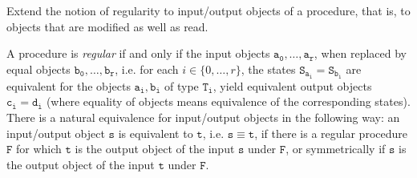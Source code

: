 \begin{Exercise}
    Extend the notion of regularity to input/output objects of a procedure, 
    that is, to objects that are modified as well as read.
\end{Exercise}

\begin{solution}
    A procedure is \textit{regular} if and only if the input objects 
    $\mathtt{a_{0}}, \dots ,\mathtt{a_{r}}$, when replaced by equal objects 
    $\mathtt{b_{0}}, \dots, \mathtt{b_{r}}$, i.e. for each $i \in 
    \{0, \dots, r \}$, the states $\mathtt{S_{a_{i}}} = \mathtt{S_{b_{i}}}$ are 
    equivalent for the objects $\mathtt{a_{i}}, \mathtt{b_{i}}$ of type 
    $\mathtt{T_i}$, yield equivalent output objects $\mathtt{c_{i}} = \mathtt{d_{i}}$ 
    (where equality of objects means equivalence of the corresponding 
    states). There is a natural equivalence for input/output objects 
    in the following way: an input/output object $\mathtt{s}$ is 
    equivalent to $\mathtt{t}$, i.e. $\mathtt{s} \equiv \mathtt{t}$, if 
    there is a regular procedure $\mathtt{F}$ for which $\mathtt{t}$ is 
    the output object of the input $\mathtt{s}$ under $\mathtt{F}$, or symmetrically 
    if $\mathtt{s}$ is the output object of the input $\mathtt{t}$ under $\mathtt{F}$.
\end{solution}
